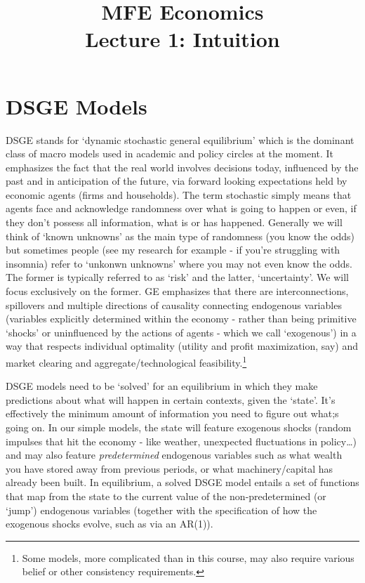 \documentclass[authoryear,11pt]{elsarticle}
\begin{document}
\begin{frontmatter}
\title{MFE Economics\\Lecture 1: Intuition}
\end{frontmatter}


\section{DSGE Models}
DSGE stands for `dynamic stochastic general equilibrium' which is the dominant class of macro models used in academic and policy circles at the moment. It emphasizes the fact that the real world involves decisions today, influenced by the past and in anticipation of the future, via forward looking expectations held by economic agents (firms and households). The term stochastic simply means that agents face and acknowledge randomness over what is going to happen or even, if they don't possess all information, what is or has happened. Generally we will think of `known unknowns' as the main type of randomness (you know the odds) but sometimes people (see my research for example - if you're struggling with insomnia) refer to `unkonwn unknowns' where you may not even know the odds. The former is typically referred to as `risk' and the latter, `uncertainty'. We will focus exclusively on the former. GE emphasizes that there are interconnections, spillovers and multiple directions of causality connecting endogenous variables (variables explicitly determined within the economy - rather than being primitive `shocks' or uninfluenced by the actions of agents - which we call `exogenous') in a way that respects individual optimality (utility and profit maximization, say) and market clearing and aggregate/technological feasibility.\footnote{Some models, more complicated than in this course, may also require various belief or other consistency requirements.}

DSGE models need to be `solved' for an equilibrium in which they make predictions about what will happen in certain contexts, given the `state'. It's effectively the minimum amount of information you need to figure out what;s going on. In our simple models, the state will feature exogenous shocks (random impulses that hit the economy - like weather, unexpected fluctuations in policy\ldots) and may also feature \textit{predetermined} endogenous variables such as what wealth you have stored away from previous periods, or what machinery/capital has already been built. In equilibrium, a solved DSGE model entails a set of functions that map from the state to the current value of the non-predetermined (or `jump') endogenous variables (together with the specification of how the exogenous shocks evolve, such as via an AR(1)).
\end{document}
